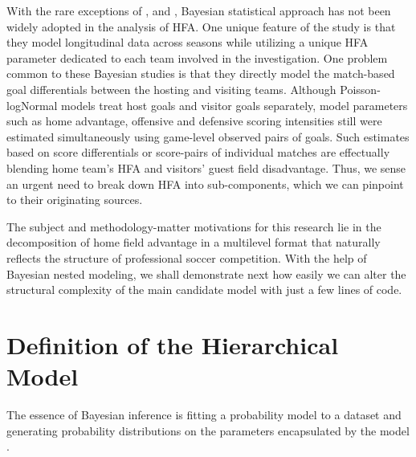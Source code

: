 \documentclass[]{interact}
\theoremstyle{plain}%
\theoremstyle{definition}
\theoremstyle{remark}
\begin{document}
With the rare exceptions of \cite{doi:10.1080/02664760802684177}, \cite{Gajewski2006} and \cite{Glickman1998, Glickman2005}, Bayesian statistical approach has not been widely adopted in the analysis of HFA. One unique feature of the \cite{Gajewski2006} study is that they model longitudinal data across seasons while utilizing a unique HFA parameter dedicated to each team involved in the investigation. One problem common to these Bayesian studies is that they directly model the match-based goal differentials between the hosting and visiting teams. Although Poisson-logNormal models \citep{doi:10.1080/02664760802684177,doi:10.1111/1467-9884.00366} treat host goals and visitor goals separately, model parameters such as home advantage, offensive and defensive scoring intensities still were estimated simultaneously using game-level observed pairs of goals.   Such estimates based on score differentials  or score-pairs of individual matches are effectually  blending home team's HFA and visitors' guest field disadvantage. Thus, we sense an urgent need to break down HFA into sub-components, which we can pinpoint to their originating sources.    

The subject and methodology-matter motivations for this research lie in the decomposition of home field advantage in a multilevel format that naturally reflects the structure of professional soccer competition. With the help of Bayesian nested modeling, we shall demonstrate next how easily we can alter the structural complexity of the main candidate model with just a few lines of code.


	

\section{Definition of the Hierarchical Model} 

The essence of Bayesian inference is fitting a probability model to a dataset and generating probability distributions on the parameters encapsulated by the model \citep{Gelman2014}.
\end{document}
